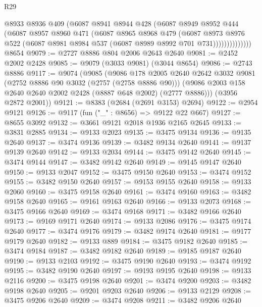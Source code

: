 \begin{lexlean}{R29}
\begin{coremodule}
                  @8933
                  @8936
                  @409
                  (@6087
                    @8941
                    @8944
                    @428
                    (@6087
                      @8949
                      @8952
                      @444
                      (@6087
                        @8957
                        @8960
                        @471
                        (@6087
                          @8965
                          @8968
                          @479
                          (@6087
                            @8973
                            @8976
                            @522
                            (@6087 @8981 @8984 @537 (@6087 @8989 @8992 @701 @731))))))))))))))
    @8654
@9079 := @2727 @8886 @804 @2006 @2643 @2640
@9081 := @2452 @2002 @2428
@9085 := @9079 (@3033 @9081) (@3044 @8654)
@9086 := @2743 @8886
@9117 := @9074
    (@9085
      (@9086
        @178
        @2005
        @2640
        @2642
        @3032
        @9081
        (@2752 @8886 @90 @3032 (@2757 (@2758 @8886 @90)))
        (@9086 @2003 @158 @2640 @2640 @2002 @2428 (@8887 @648 @2002) (@2777 @8886)))
      (@3956 @2872 @2001))
@9121 := @8383 (@2684 (@2691 @3153) @2694)
@9122 := @2954 @9121
@9126 := @9117 (fun ("_" : @8656) => @9122 @22 @667)
@9127 := @8655 @3092
@9132 := @3661 @9121 @2018 @1936 @2165 @2645
@9133 := @3831 @2885
@9134 := @9133 @2023
@9135 := @3475 @9134
@9136 := @9135 @2640
@9137 := @3474 @9136
@9139 := @3482 @9134 @2640
@9141 := @9137 @9139 @2640
@9142 := @9133 @2034
@9144 := @3475 @9142 @2640
@9145 := @3474 @9144
@9147 := @3482 @9142 @2640
@9149 := @9145 @9147 @2640
@9150 := @9133 @2047
@9152 := @3475 @9150 @2640
@9153 := @3474 @9152
@9155 := @3482 @9150 @2640
@9157 := @9153 @9155 @2640
@9158 := @9133 @2060
@9160 := @3475 @9158 @2640
@9161 := @3474 @9160
@9163 := @3482 @9158 @2640
@9165 := @9161 @9163 @2640
@9166 := @9133 @2073
@9168 := @3475 @9166 @2640
@9169 := @3474 @9168
@9171 := @3482 @9166 @2640
@9173 := @9169 @9171 @2640
@9174 := @9133 @2086
@9176 := @3475 @9174 @2640
@9177 := @3474 @9176
@9179 := @3482 @9174 @2640
@9181 := @9177 @9179 @2640
@9182 := @9133 @889
@9184 := @3475 @9182 @2640
@9185 := @3474 @9184
@9187 := @3482 @9182 @2640
@9189 := @9185 @9187 @2640
@9190 := @9133 @2103
@9192 := @3475 @9190 @2640
@9193 := @3474 @9192
@9195 := @3482 @9190 @2640
@9197 := @9193 @9195 @2640
@9198 := @9133 @2116
@9200 := @3475 @9198 @2640
@9201 := @3474 @9200
@9203 := @3482 @9198 @2640
@9205 := @9201 @9203 @2640
@9206 := @9133 @2129
@9208 := @3475 @9206 @2640
@9209 := @3474 @9208
@9211 := @3482 @9206 @2640

\end{coremodule}
\end{lexlean}
